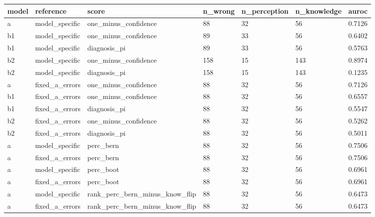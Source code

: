 \begin{tabular}{lllllll}
\hline
model & reference & score & n\_wrong & n\_perception & n\_knowledge & auroc \\
\hline
a & model\_specific & one\_minus\_confidence & 88 & 32 & 56 & 0.7126 \\
b1 & model\_specific & one\_minus\_confidence & 89 & 33 & 56 & 0.6402 \\
b1 & model\_specific & diagnosis\_pi & 89 & 33 & 56 & 0.5763 \\
b2 & model\_specific & one\_minus\_confidence & 158 & 15 & 143 & 0.8974 \\
b2 & model\_specific & diagnosis\_pi & 158 & 15 & 143 & 0.1235 \\
a & fixed\_a\_errors & one\_minus\_confidence & 88 & 32 & 56 & 0.7126 \\
b1 & fixed\_a\_errors & one\_minus\_confidence & 88 & 32 & 56 & 0.6557 \\
b1 & fixed\_a\_errors & diagnosis\_pi & 88 & 32 & 56 & 0.5547 \\
b2 & fixed\_a\_errors & one\_minus\_confidence & 88 & 32 & 56 & 0.5262 \\
b2 & fixed\_a\_errors & diagnosis\_pi & 88 & 32 & 56 & 0.5011 \\
a & model\_specific & perc\_bern & 88 & 32 & 56 & 0.7506 \\
a & fixed\_a\_errors & perc\_bern & 88 & 32 & 56 & 0.7506 \\
a & model\_specific & perc\_boot & 88 & 32 & 56 & 0.6961 \\
a & fixed\_a\_errors & perc\_boot & 88 & 32 & 56 & 0.6961 \\
a & model\_specific & rank\_perc\_bern\_minus\_know\_flip & 88 & 32 & 56 & 0.6473 \\
a & fixed\_a\_errors & rank\_perc\_bern\_minus\_know\_flip & 88 & 32 & 56 & 0.6473 \\
\hline
\end{tabular}
